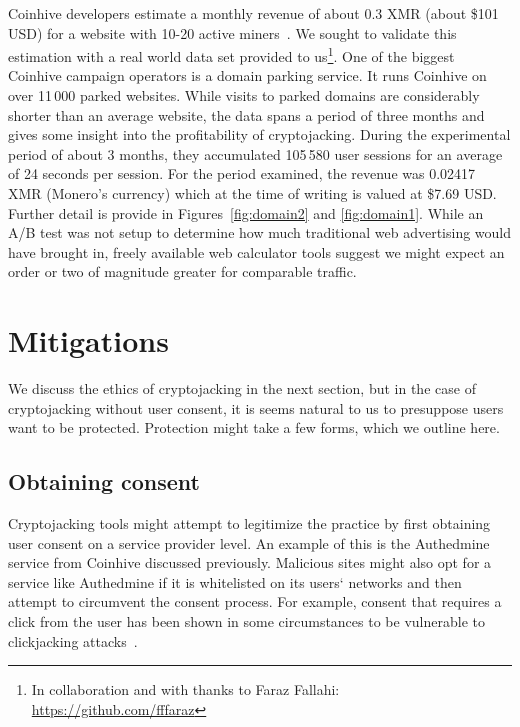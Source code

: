 Coinhive developers estimate a monthly revenue of about 0.3 XMR (about \$101 USD) for a website with 10-20 active miners~\cite{coinhive}. We sought to validate this estimation with a real world data set provided to us\footnote{In collaboration and with thanks to Faraz Fallahi: \url{https://github.com/fffaraz}}. One of the biggest Coinhive campaign operators is a domain parking service. It runs Coinhive on over 11\,000 parked websites. While visits to parked domains are considerably shorter than an average website, the data spans a period of three months and gives some insight into the profitability of cryptojacking. During the experimental period of about 3 months, they accumulated 105\,580 user sessions for an average of 24 seconds per session. For the period examined, the revenue was 0.02417 XMR (Monero's currency) which at the time of writing is valued at \$7.69 USD. Further detail is provide in Figures~\ref{fig:domain2} and \ref{fig:domain1}. While an A/B test was not setup to determine how much traditional web advertising would have brought in, freely available web calculator tools suggest we might expect an order or two of magnitude greater for comparable traffic. 






\section{Mitigations}

We discuss the ethics of cryptojacking in the next section, but in the case of cryptojacking without user consent, it is seems natural to us to presuppose users want to be protected. Protection might take a few forms, which we outline here.

\subsection{Obtaining consent}

Cryptojacking tools might attempt to legitimize the practice by first obtaining user consent on a service provider level. An example of this is the Authedmine service from Coinhive discussed previously. Malicious sites might also opt for a service like Authedmine if it is whitelisted on its users` networks and then attempt to circumvent the consent process. For example, consent that requires a click from the user has been shown in some circumstances to be vulnerable to clickjacking attacks~\cite{rydstedt2010busting}.

